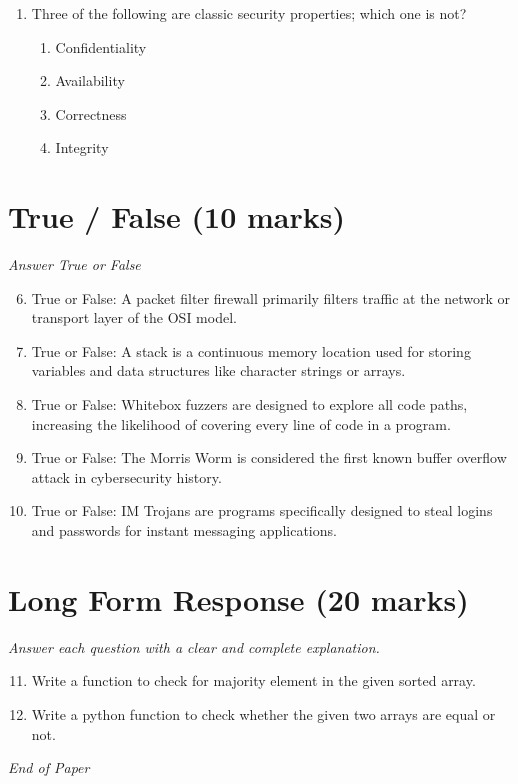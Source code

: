 \documentclass[12pt]{article}
\begin{document}
\begin{enumerate}[label=\arabic*.]
\begin{enumerate}[label=(\alph*)]
    \item Each input is mutation that follows a given grammar
    \item It only makes sense for file-based fuzzing, not network-based fuzzing
\end{enumerate}
\item Three of the following are classic security properties; which one is not?
\begin{enumerate}[label=(\alph*)]
    \item Confidentiality
    \item Availability
    \item Correctness
    \item Integrity
\end{enumerate}
\end{enumerate}

\section*{True / False (10 marks)}
\textit{Answer True or False}
\begin{enumerate}[label=\arabic*.]
\setcounter{enumi}{5}
\item True or False: A packet filter firewall primarily filters traffic at the network or transport layer of the OSI model.
\item True or False: A stack is a continuous memory location used for storing variables and data structures like character strings or arrays.
\item True or False: Whitebox fuzzers are designed to explore all code paths, increasing the likelihood of covering every line of code in a program.
\item True or False: The Morris Worm is considered the first known buffer overflow attack in cybersecurity history.
\item True or False: IM Trojans are programs specifically designed to steal logins and passwords for instant messaging applications.
\end{enumerate}

\section*{Long Form Response (20 marks)}
\textit{Answer each question with a clear and complete explanation.}
\begin{enumerate}[label=\arabic*.]
\setcounter{enumi}{10}
\item Write a function to check for majority element in the given sorted array.
\item Write a python function to check whether the given two arrays are equal or not.
\end{enumerate}

\vfill
\noindent\textit{End of Paper}
\end{document}
